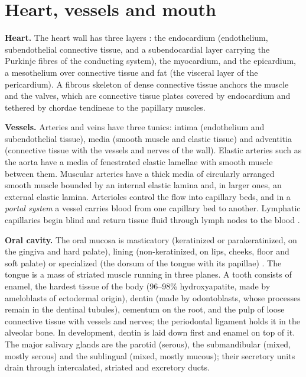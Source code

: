 \section{Heart, vessels and mouth}
\label{section-heart-mouth}

\textbf{Heart.} The heart wall has three
layers \cite[Chapter 13]{ross2011histology}:
the endocardium (endothelium, subendothelial
connective tissue, and a subendocardial layer
carrying the Purkinje fibres of the
conducting system), the myocardium, and the
epicardium, a mesothelium over connective
tissue and fat (the visceral layer of the
pericardium). A fibrous skeleton of dense
connective tissue anchors the muscle and the
valves, which are connective tissue plates
covered by endocardium and tethered by
chordae tendineae to the papillary muscles.

\textbf{Vessels.} Arteries and veins have
three tunics: intima (endothelium and
subendothelial tissue), media (smooth muscle
and elastic tissue) and adventitia
(connective tissue with the vessels and
nerves of the wall). Elastic arteries such as
the aorta have a media of fenestrated elastic
lamellae with smooth muscle between them.
Muscular arteries have a thick media of
circularly arranged smooth muscle bounded by
an internal elastic lamina and, in larger
ones, an external elastic lamina. Arterioles
control the flow into capillary beds, and in
a \emph{portal system} a vessel carries blood
from one capillary bed to another. Lymphatic
capillaries begin blind and return tissue
fluid through lymph nodes to the blood
\cite[Chapter 13]{ross2011histology}.

\textbf{Oral cavity.} The oral mucosa is
masticatory (keratinized or parakeratinized,
on the gingiva and hard palate), lining
(non-keratinized, on lips, cheeks, floor and
soft palate) or specialized (the dorsum of
the tongue with its papillae) \cite[Chapter
16]{ross2011histology}. The tongue is a mass
of striated muscle running in three planes. A
tooth consists of enamel, the hardest tissue
of the body (96--98\% hydroxyapatite, made by
ameloblasts of ectodermal origin), dentin
(made by odontoblasts, whose processes remain
in the dentinal tubules), cementum on the
root, and the pulp of loose connective tissue
with vessels and nerves; the periodontal
ligament holds it in the alveolar bone. In
development, dentin is laid down first and
enamel on top of it. The major salivary
glands are the parotid (serous), the
submandibular (mixed, mostly serous) and the
sublingual (mixed, mostly mucous); their
secretory units drain through intercalated,
striated and excretory ducts.

